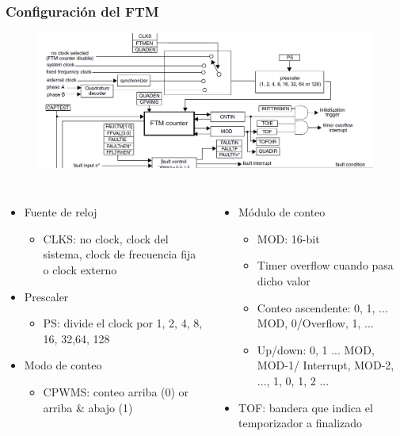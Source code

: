 \documentclass[10.5pt,scale=1.0,t,aspectratio=169,hyperref={pdfpagelabels=false}]{beamer}
\begin{document}
\begin{frame}
	\frametitle{Configuración del FTM}
	\vspace{-0.3cm}
	{\footnotesize
		\begin{figure}
			\centering
			\includegraphics[scale=0.4]{06_TimerConfig}
		\end{figure}
	
		\begin{columns}
			\begin{itemize}
				\item Fuente de reloj
				\begin{itemize}
					\item CLKS: no clock, clock del sistema, clock de frecuencia fija o clock externo
				\end{itemize}
				\item Prescaler
				\begin{itemize}
					\item PS: divide el clock por 1, 2, 4, 8, 16, 32,64, 128
				\end{itemize}
				\item Modo de conteo
				\begin{itemize}
					\item CPWMS: conteo arriba (0) or arriba \& abajo (1)
				\end{itemize}
			\end{itemize}
		
			\begin{itemize}
				\item Módulo de conteo
				\begin{itemize}
					\item MOD: 16-bit
					\item Timer overflow cuando pasa dicho valor
					\item Conteo ascendente: 0, 1, ... MOD, 0/Overflow, 1, ...
					\item Up/down: 0, 1 ... MOD, MOD-1/ Interrupt, MOD-2, ..., 1, 0, 1, 2 ...
				\end{itemize}
				\item TOF: bandera que indica el temporizador a finalizado
			\end{itemize}
		\end{columns}
	}
\end{frame}
\end{document}
